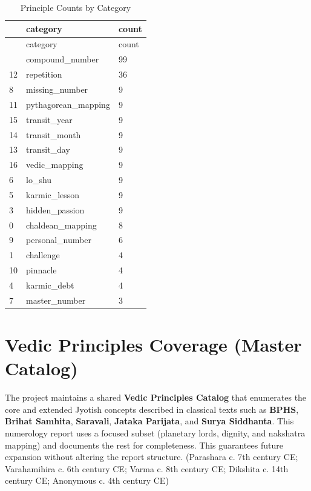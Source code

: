 \documentclass[
  11pt,
  a4paper,
  oneside,
  openany]{article}
\begin{document}
\label{num-catalog-counts}
\begin{longtable}[]{@{}lll@{}}
\caption{Principle Counts by Category}\tabularnewline
\toprule\noalign{}
& category & count \\
\midrule\noalign{}
\endfirsthead
\toprule\noalign{}
& category & count \\
\midrule\noalign{}
\endhead
\bottomrule\noalign{}
\endlastfoot
2 & compound\_number & 99 \\
12 & repetition & 36 \\
8 & missing\_number & 9 \\
11 & pythagorean\_mapping & 9 \\
15 & transit\_year & 9 \\
14 & transit\_month & 9 \\
13 & transit\_day & 9 \\
16 & vedic\_mapping & 9 \\
6 & lo\_shu & 9 \\
5 & karmic\_lesson & 9 \\
3 & hidden\_passion & 9 \\
0 & chaldean\_mapping & 8 \\
9 & personal\_number & 6 \\
1 & challenge & 4 \\
10 & pinnacle & 4 \\
4 & karmic\_debt & 4 \\
7 & master\_number & 3 \\
\end{longtable}

\section{Vedic Principles Coverage (Master
Catalog)}\label{vedic-principles-coverage-master-catalog}

The project maintains a shared \textbf{Vedic Principles Catalog} that
enumerates the core and extended Jyotish concepts described in classical
texts such as \textbf{BPHS}, \textbf{Brihat Samhita}, \textbf{Saravali},
\textbf{Jataka Parijata}, and \textbf{Surya Siddhanta}. This numerology
report uses a focused subset (planetary lords, dignity, and nakshatra
mapping) and documents the rest for completeness. This guarantees future
expansion without altering the report structure. (Parashara c. 7th
century CE; Varahamihira c. 6th century CE; Varma c. 8th century CE;
Dikshita c. 14th century CE; Anonymous c. 4th century CE)
\end{document}
